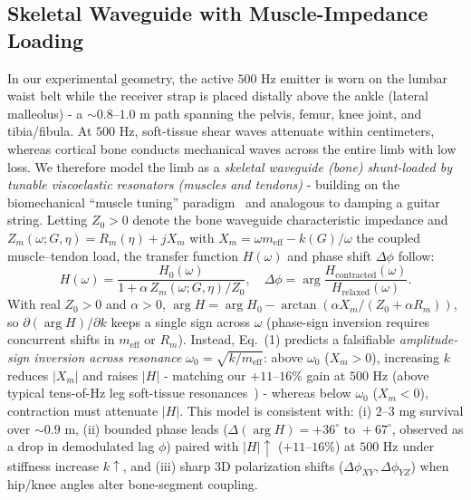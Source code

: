 \documentclass[conference]{IEEEtran}
\begin{document}
\subsection{Skeletal Waveguide with Muscle-Impedance Loading}
In our experimental geometry, the active $500\text{ Hz}$ emitter is worn on the lumbar waist belt while the receiver strap is placed distally above the ankle (lateral malleolus) - a $\sim 0.8\text{--}1.0\text{ m}$ path spanning the pelvis, femur, knee joint, and tibia/fibula. At $500\text{ Hz}$, soft-tissue shear waves attenuate within centimeters, whereas cortical bone conducts mechanical waves across the entire limb with low loss. We therefore model the limb as a \textit{skeletal waveguide (bone) shunt-loaded by tunable viscoelastic resonators (muscles and tendons)} - building on the biomechanical ``muscle tuning'' paradigm~\cite{nigg2001tuning,wakeling2001leg} and analogous to damping a guitar string. Letting $Z_0 > 0$ denote the bone waveguide characteristic impedance and $Z_m(\omega; G, \eta) = R_m(\eta) + jX_m$ with $X_m = \omega m_{\text{eff}} - k(G)/\omega$ the coupled muscle--tendon load, the transfer function $H(\omega)$ and phase shift $\Delta\phi$ follow:
\begin{equation}
H(\omega) = \frac{H_0(\omega)}{1 + \alpha\, Z_m(\omega; G, \eta)/Z_0}, \quad \Delta\phi = \arg\!\frac{H_{\text{contracted}}(\omega)}{H_{\text{relaxed}}(\omega)}.
\end{equation}
With real $Z_0 > 0$ and $\alpha > 0$, $\arg H = \arg H_0 - \arctan(\alpha X_m / (Z_0 + \alpha R_m))$, so $\partial(\arg H)/\partial k$ keeps a single sign across $\omega$ (phase-sign inversion requires concurrent shifts in $m_{\text{eff}}$ or $R_m$). Instead, Eq.~(1) predicts a falsifiable \textit{amplitude-sign inversion across resonance $\omega_0 = \sqrt{k/m_{\text{eff}}}$}: above $\omega_0$ ($X_m > 0$), increasing $k$ reduces $|X_m|$ and raises $|H|$ - matching our $+11\text{--}16\%$ gain at $500\text{ Hz}$ (above typical tens-of-Hz leg soft-tissue resonances~\cite{wakeling2001leg}) - whereas below $\omega_0$ ($X_m < 0$), contraction must attenuate $|H|$. This model is consistent with: (i) $2\text{--}3\text{ mg}$ survival over $\sim 0.9\text{ m}$, (ii) bounded phase leads ($\Delta(\arg H) = +36^\circ\text{ to }+67^\circ$, observed as a drop in demodulated lag $\phi$) paired with $|H|\uparrow$ ($+11\text{--}16\%$) at $500\text{ Hz}$ under stiffness increase $k\uparrow$, and (iii) sharp 3D polarization shifts ($\Delta\phi_{XY}, \Delta\phi_{YZ}$) when hip/knee angles alter bone-segment coupling.
\end{document}

